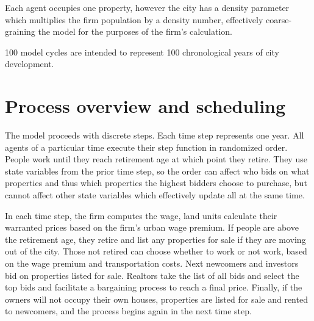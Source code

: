 Each agent occupies one property, however the city has a density parameter which multiplies the firm population by a density number, effectively coarse-graining the model for the purposes of the firm's calculation. 

100 model cycles are intended to represent 100 chronological years of city development.




\section{Process overview and scheduling}
The model proceeds with discrete steps. Each time step represents one year.  All agents of a particular time execute their step function in randomized order. People work until they reach retirement age at which point they retire. They use state variables from the prior time step, so the order can affect who bids on what properties and thus which properties the highest bidders choose to purchase, but cannot affect other state variables which effectively update all at the same time. %

In each time step, the firm computes the wage, land units calculate their warranted prices based on the firm's urban wage premium. If people are above the retirement age, they retire and list any properties for sale if they are moving out of the city. Those not retired can choose whether to work or not work, based on the wage premium and transportation costs. Next newcomers and investors bid on properties listed for sale. Realtors take the list of all bids and select the top bids and facilitate a bargaining process to reach a final price. Finally, if the owners will not occupy their own houses, properties are listed for sale and rented to newcomers, and the process begins again in the next time step. 



